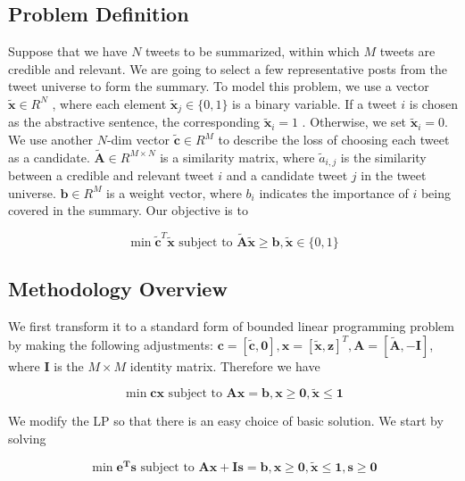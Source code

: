 \documentclass{article}
\begin{document}
\subsection{Problem Definition}
Suppose that we have $N$ tweets to be summarized, within which $M$ tweets are credible and relevant. We are going to select a few representative posts from the tweet universe to form the summary. To model this problem, we use a vector $\tilde{\mathbf{x}}\in R^N$ , where each element $\tilde{\mathbf{x}}_j\in \{0,1\}$ is a binary variable. If a tweet $i$ is chosen as the abstractive sentence, the corresponding $\tilde{\mathbf{x}}_i=1$ . Otherwise, we set  $\tilde{\mathbf{x}}_i=0$. We use another $N$-dim vector $\tilde{\mathbf{c}}\in R^M$ to describe the loss of choosing each tweet as a candidate. $\tilde{\mathbf{A}}\in R^{M\times N}$  is a similarity matrix, where $\tilde{a}_{i,j}$  is the similarity between a credible and relevant tweet $i$ and a candidate tweet $j$ in the tweet universe. $\mathbf{b}\in R^{M}$ is a weight vector, where $b_{i}$ indicates the importance of $i$ being covered in the summary. Our objective is to

\begin{equation*}
\min \tilde{\mathbf{c}}^T\tilde{\mathbf{x}}\textrm{ subject to } \tilde{\mathbf{A}}\tilde{\mathbf{x}}\geq \mathbf{b}, \tilde{\mathbf{x}}\in \{0,1\}
\end{equation*}

\subsection{Methodology Overview}
We first transform it to a standard form of bounded linear programming problem by making the following adjustments: $\mathbf{c}=[\tilde{\mathbf{c}},\mathbf{0}],\mathbf{x}=[\tilde{\mathbf{x}},\mathbf{z}]^T,\mathbf{A}=[\tilde{\mathbf{A}},-\mathbf{I}]$, where $\mathbf{I}$ is the $M\times M$ identity matrix. Therefore we have

\begin{equation}
\min \mathbf{cx} \textrm{ subject to } \mathbf{Ax} = \mathbf{b}, \mathbf{x}\geq \mathbf{0},\tilde{\mathbf{x}} \leq \mathbf{1}
\end{equation}

We modify the LP so that there is an easy choice of basic solution. We start by solving

\begin{equation}
\min \mathbf{e^{T}s} \textrm{ subject to } \mathbf{Ax} + \mathbf{Is} = \mathbf{b}, \mathbf{x}\geq \mathbf{0},\tilde{\mathbf{x}} \leq \mathbf{1},\mathbf{s}\geq \mathbf{0}
\end{equation}
\end{document}
